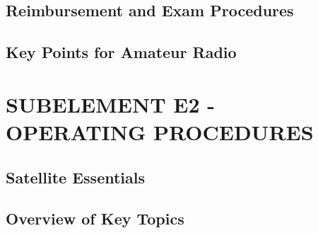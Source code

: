 \documentclass[12pt]{book}
\begin{document}
\section{Reimbursement and Exam Procedures}











\section{Key Points for Amateur Radio}











\chapter{SUBELEMENT E2 - OPERATING PROCEDURES}
\section{Satellite Essentials}












\section{Overview of Key Topics}












\end{document}
